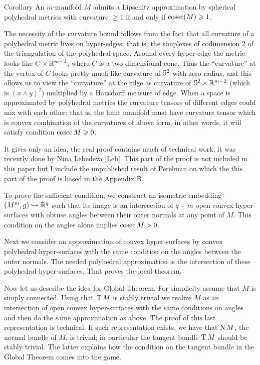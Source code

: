 \documentclass{article}
\begin{document}
\begin{thm}{Corollary} 
An $m$-manifold $M$ admits a Lipschitz approximation by
spherical polyhedral metrics with curvature $\ge 1$ 
if and only if $\mathop{\rm cosec}\nolimits(M)\geqslant 1$.
\end{thm}

The necessity of the curvature bound follows from the fact that all curvature
of a polyhedral metric lives on hyper-edges;
that is, the simplexes of codimension $2$ of the triangulation of the polyhedral space.
Around every hyper-edge the metric looks like $C\times \mathbb{R}^{m-2}$,
where $C$ is a two-dimensional cone.
Thus the ``curvature'' at the vertex of $C$
looks pretty much like curvature of $\mathbb{S}^2$ with zero radius,
 and this allows us to view the ``curvature'' at the edge as curvature of
$\mathbb{S}^2\times \mathbb{R}^{m-2}$ (which is $(x\wedge y)^2$) multiplied by a
Hausdorff measure of edge.
 When a space is approximated by polyhedral metrics the curvature
tensors of different edges could mix with each other;
that is, the limit
manifold must have curvature tensor
which is convex combination of the curvatures of above form,
in other words, it will satisfy condition
 $\mathop{\rm cosec}\nolimits M\geqslant 0$.

It gives only an idea, the real proof contains much of technical work; it was recently done by Nina Lebedeva [Leb].
This part of the proof is not included in this paper but I include the unpublished result of Perelman on which the this part of the proof is based in the Appendix B.

To prove the sufficient condition, we construct an isometric embedding $(M^m,g)\hookrightarrow\mathbb{R}^q$ such that its image is an intersection of $q-m$ open convex hyper-surfaces with obtuse angles between their outer normals at any point of $M$.
This condition on the angles alone implies $\mathop{\rm cosec}\nolimits M>0$.

Next we consider an approximation of convex hyper-surfaces
by convex polyhedral hyper-surfaces with the same condition on the angles between the outer normals.
The needed polyhedral approximation is the intersection of these
polyhedral hyper-surfaces. 
That proves the local theorem.

Now let us describe the idea for Global Theorem.
For simplicity assume that $M$ is simply connected.
Using that $\text{\rm T}\,M$ is stably trivial we realize $M$ as an intersection of open convex hyper-surfaces with
the same conditions on angles and then do the same approximation as above.
The proof of this last representation is technical. 
If such representation exists, we have that $\text{\rm N}\, M$, the normal bundle of
$M$, is trivial; in particular the tangent bundle $\text{\rm T}\, M$ should
be stably trivial.
The latter explains how the condition on the tangent bundle in the Global Theorem comes into the game.
\end{document}
